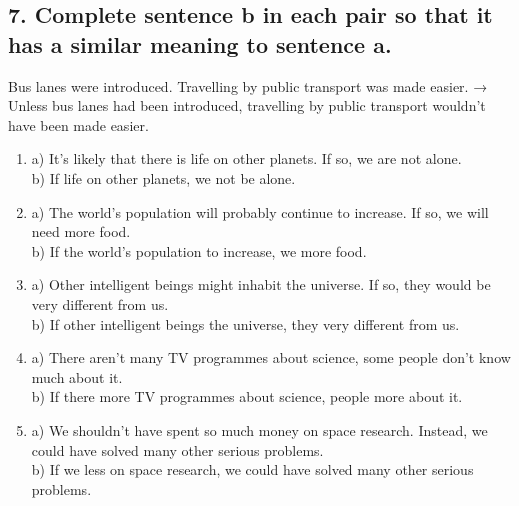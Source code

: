 \subsection*{7. Complete sentence b in each pair so that it has a similar meaning to sentence a.}
 Bus lanes were introduced. Travelling by public transport was made easier. → Unless
bus lanes had been introduced, travelling by public transport wouldn’t have been made easier.

\begin{enumerate}
      \item a) It’s likely that there is life on other planets. If so, we are not alone. \\
            b) If \underline{\hspace{2cm}} life on other planets, we \underline{\hspace{2cm}} not be alone.

      \item a) The world’s population will probably continue to increase. If so, we will need more food. \\
            b) If the world’s population \underline{\hspace{2cm}} to increase, we \underline{\hspace{2cm}} more food.

      \item a) Other intelligent beings might inhabit the universe. If so, they would be very different from us. \\
            b) If other intelligent beings \underline{\hspace{2cm}} the universe, they \underline{\hspace{2cm}} very different from us.

      \item a) There aren’t many TV programmes about science, some people don’t know much about it. \\
            b) If there \underline{\hspace{2cm}} more TV programmes about science, people \underline{\hspace{2cm}} more about it.

      \item a) We shouldn’t have spent so much money on space research. Instead, we could have solved many other serious problems. \\
            b) If we \underline{\hspace{2cm}} less on space research, we could have solved many other serious problems.


\end{enumerate}
